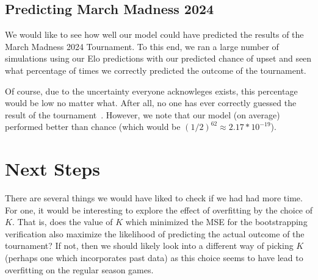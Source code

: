 \documentclass{article}
\begin{document}
\subsection{Predicting March Madness 2024}
We would like to see how well our model could have predicted the results of the March Madness 2024 Tournament. To this end, we ran a large number of simulations using our Elo predictions with our predicted chance of upset and seen what percentage of times we correctly predicted the outcome of the tournament.

Of course, due to the uncertainty everyone acknowleges exists, this percentage would be low no matter what. After all, no one has ever correctly guessed the result of the tournament~\cite{cbsnewsAnyoneEver}. However, we note that our model (on average) performed better than chance (which would be $(1/2)^62 \approx 2.17 * 10^{-19}$).

\section{Next Steps}
There are several things we would have liked to check if we had had more time. For one, it would be interesting to explore the effect of overfitting by the choice of $K$. That is, does the value of $K$ which minimized the MSE for the bootstrapping verification also maximize the likelihood of predicting the actual outcome of the tournament? If not, then we should likely look into a different way of picking $K$ (perhaps one which incorporates past data) as this choice seems to have lead to overfitting on the regular season games. 



\end{document}
